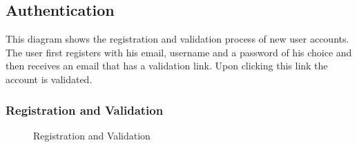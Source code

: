 \subsection{Authentication}

This diagram shows the registration and validation process of new user accounts. The user first registers with his email, username and a password of his choice and then receives an email that has a validation link. Upon clicking this link the account is validated.
\subsubsection{Registration and Validation}
\begin{figure}[!htb]
    \centering
    \caption{Registration and Validation}
    \label{fig:seq-auth-register-and-validate}
\end{figure}

